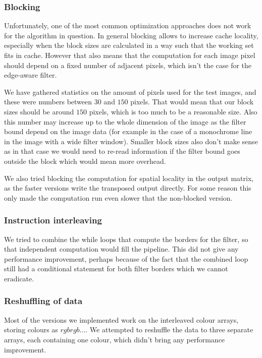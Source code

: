 \subsubsection{Blocking}

Unfortunately, one of the most common optimization approaches does not work for the algorithm in question. In general blocking allows to increase cache locality, especially when the block sizes are calculated in a way such that the working set fits in cache. However that also means that the computation for each image pixel should depend on a fixed number of adjacent pixels, which isn't the case for the edge-aware filter.

We have gathered statistics on the amount of pixels used for the test images, and these were numbers between $30$ and $150$ pixels. That would mean that our block sizes should be around $150$ pixels, which is too much to be a reasonable size. Also this number may increase up to the whole dimension of the image as the filter bound depend on the image data (for example in the case of a monochrome line in the image with a wide filter window). Smaller block sizes also don't make sense as in that case we would need to re-read information if the filter bound goes outside the block which would mean more overhead. 

We also tried blocking the computation for spatial locality in the output matrix, as the faster versions write the transposed output directly. For some reason this only made the computation run even slower that the non-blocked version.

\subsubsection{Instruction interleaving}

We tried to combine the while loops that compute the borders for the filter, so that independent computation would fill the pipeline. This did not give any performance improvement, perhaps because of the fact that the combined loop still had a conditional statement for both filter borders which we cannot eradicate.

\subsubsection{Reshuffling of data}


Most of the versions we implemented work on the interleaved colour arrays, storing colours as $rgbrgb\dots$. We attempted to reshuffle the data to three separate arrays, each containing one colour, which didn't bring any performance improvement. 

